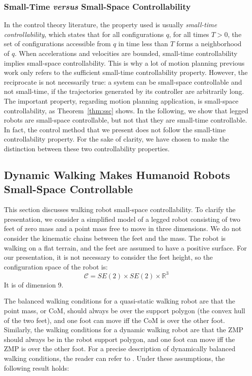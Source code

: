 \documentclass{article}
\begin{document}
\subsubsection{Small-Time \textit{versus} Small-Space Controllability}
In the control theory literature, the property used is usually \textit{small-time controllability}, 
which states that for  all configurations  $q$, for  all times
$T>0$, the set of configurations accessible from $q$ in time less than
$T$ forms a  neighborhood of $q$. When accelerations and velocities are bounded,
small-time controllability implies small-space controllability. This is why 
a lot of motion planning previous work only refers to the sufficient small-time controllability
property. However, the reciprocate is not necessarily true:  a system can be 
small-space controllable and
not small-time, if the trajectories generated by its controller are arbitrarily long.
The important property, regarding
motion planning application, is small-space controllability, as 
Theorem~\ref{thm:ssc} shows. In the following, we show that legged robots
are small-space controllable, but  not that they are small-time controllable.
In fact, the  control method that we present does not follow the small-time controllability
property. For the sake of clarity, we have chosen to make the distinction between these
two controllability properties.



\subsection{Dynamic Walking Makes Humanoid Robots Small-Space Controllable}
\label{sec:humanoid-ssc}

This section  discusses walking robot small-space controllability. To clarify
the presentation, we consider a simplified model of a legged robot consisting of two feet
of zero mass and a point mass free to move in three dimensions.
We do not consider 
the kinematic chains between the feet and the mass. The robot is walking on a flat terrain,
and the feet are assumed to have a positive surface. For our presentation, it is not 
necessary to consider the feet height, so the configuration space of the robot is:
\[
\mathcal{C} = SE(2) \times SE(2) \times \mathbb{R}^3
\]
It is of dimension 9.


The balanced walking conditions for a quasi-static walking robot are that the point
mass, or CoM, should always be over the support polygon (the convex hull of the two feet), and 
one foot can move iff the CoM is over the other foot. Similarly, the walking
conditions for a dynamic walking robot are that the ZMP should
always be in the robot support polygon, and one foot can move iff the ZMP is over the other 
foot. For a precise description of dynamically balanced walking conditions, the reader can refer
to \cite{wieber2002}. Under these assumptions, the following result holds:
\end{document}
